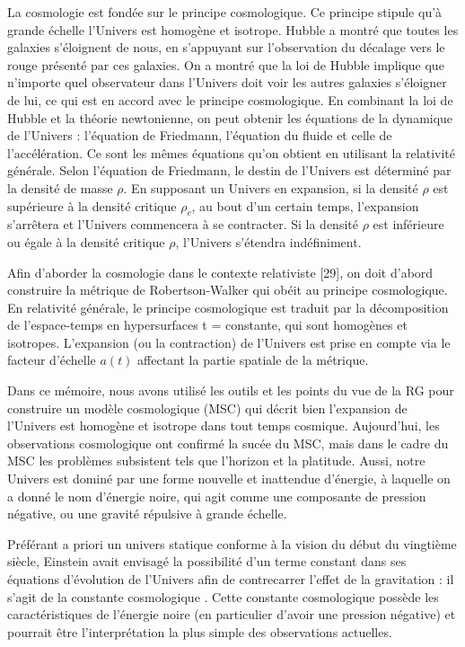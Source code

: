 \documentclass[a4paper,12pt]{report}
\theoremstyle{plain}
\theoremstyle{plain}
\begin{document}
La cosmologie est fondée sur le principe cosmologique. Ce principe stipule qu’à grande échelle l’Univers est homogène et isotrope. Hubble a montré que toutes les galaxies s’éloignent de nous, en s’appuyant sur l’observation du décalage vers le rouge présenté par ces galaxies. On a montré que la loi de Hubble implique que n’importe quel observateur dans l’Univers doit voir les autres galaxies s’éloigner de lui, ce qui est en accord avec le principe cosmologique. En combinant la loi de Hubble et la théorie newtonienne, on peut obtenir les équations de la dynamique de l’Univers : l’équation de Friedmann,
l’équation du fluide et celle de l’accélération. Ce sont les mêmes équations qu’on obtient en utilisant la relativité générale. Selon l’équation de Friedmann, le destin de l’Univers est déterminé par la densité de masse $\rho$. En
supposant un Univers en expansion, si la densité $\rho$ est supérieure à la densité
critique $\rho_{c}$, au bout d’un certain temps, l’expansion s’arrêtera et l’Univers
commencera à se contracter. Si la densité $\rho$ est inférieure ou égale à la densité critique $\rho$, l’Univers s’étendra indéfiniment.

Afin d’aborder la cosmologie dans le contexte relativiste [29], on doit
d’abord construire la métrique de Robertson-Walker qui obéit au principe
cosmologique. En relativité générale, le principe cosmologique est traduit
par la décomposition de l’espace-temps en hypersurfaces t = constante, qui
sont homogènes et isotropes. L’expansion (ou la contraction) de l’Univers
est prise en compte via le facteur d’échelle $a(t)$ affectant  la partie spatiale
de la métrique.

Dans ce mémoire, nous avons utilisé les outils et les points du vue de la RG pour construire un
modèle cosmologique (MSC) qui décrit bien l'expansion de l'Univers est homogène et isotrope dans
tout temps cosmique. Aujourd’hui, les observations cosmologique ont confirmé la sucée du MSC,
mais dans le cadre du MSC les problèmes subsistent tels que l'horizon et la platitude. Aussi, notre Univers est dominé par une forme nouvelle et inattendue d’énergie, à
	laquelle on a donné le nom d'énergie noire, qui agit comme une composante de pression
	négative, ou une gravité répulsive à grande échelle.


Préférant a priori un univers statique conforme à la vision du début du vingtième
	siècle, Einstein avait envisagé la possibilité d’un terme constant dans ses équations
	d'évolution de l’Univers afin de contrecarrer l’effet de la gravitation : il s’agit de la
	constante cosmologique . Cette constante cosmologique possède les caractéristiques de
	l’énergie noire (en particulier d’avoir une pression négative) et pourrait être l’interprétation
	la plus simple des observations actuelles. 
\end{document}

